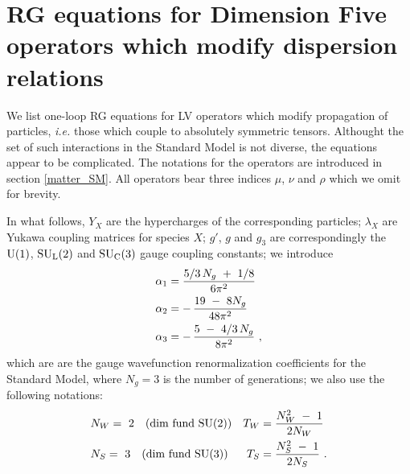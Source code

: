 \documentclass[12pt,preprintnumbers,nofootinbib]{revtex4}
\newcommand{\suc}{{{\rm SU}_{\rm C}(3)}}
\newcommand{\sul}{{{\rm SU}_{\rm L}(2)}}
\newcommand{\ue}{{{\rm U}(1)}}
\begin{document}
\newpage
%
%
\appendix
\section{RG equations for Dimension Five operators which modify dispersion relations}
\label{RG_SM}

	

	We list one-loop RG equations for LV operators which modify propagation of
	particles, {\it i.e.} those which couple to absolutely symmetric tensors.
	Althought the set of such interactions in the Standard Model is not
	diverse, the equations appear to be complicated.
	The notations for the operators are introduced in section 
	\ref{matter_SM}.
	All operators bear three indices $ \mu $, $ \nu $ and $ \rho $ which we
	omit for brevity.

	In what follows, 
	$ Y_X $  are the hypercharges of the corresponding particles;
	$ \lambda_X $ are Yukawa coupling matrices for species  $ X $;
	$ g' $, $ g $ and $ g_3 $ are correspondingly the $ \ue $, $ \sul $ and $ \suc $ gauge
	coupling constants; 
	we introduce 
%
\begin{align}
\notag
	\alpha_1 & =        
			    \frac{5/3\, N_g ~+~ 1/8}
                                        {6\pi^2}  \\
\notag
	\alpha_2 & =    -\, \frac{19 ~-~ 8 N_g}
		                  {48\pi^2}  \\
\notag
	\alpha_3 & =    -\, \frac{5 ~-~4/3\, N_g}
			         {8\pi^2}~,
\end{align}
	which are
	are the gauge wavefunction renormalization coefficients for the Standard 
	Model, where $ N_g = 3 $ is the number of generations;
	we also use the following notations:
\begin{align}
\notag
	& N_W = ~2 \quad\text{(dim fund SU(2))} &
		T_W & = \frac{N_W^2 ~-~ 1}
			       {2 N_W}       
	\\
\notag
	& N_S = ~3 \quad\text{(dim fund SU(3))} &
		T_S & = \frac{N_S^2 ~-~ 1}
			       {2 N_S}
	~.
\end{align}
\end{document}
